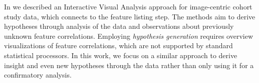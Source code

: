 \documentclass[journal]{style/vgtc} 			          %
\begin{document}
In \cite{Klemm2014VIS} we described an Interactive Visual Analysis approach for image-centric cohort study data, which connects to the feature listing step.
The methods aim to derive hypotheses through analysis of the data and observations about previously unknown feature correlations.
Employing \emph{hypothesis generation} requires overview visualizations of feature correlations, which are not supported by standard statistical processors.
In this work, we focus on a similar approach to derive insight and even new hypotheses through the data rather than only using it for a confirmatory analysis.
\end{document}
